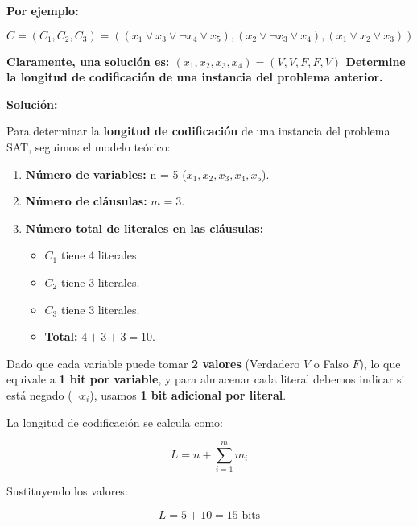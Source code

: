 \documentclass[12pt]{article}
\begin{document}
{{\begin{enumerate}
            \textbf{Por ejemplo: }

                \[
                    C = (C_1, C_2, C_3) = ((x_1 \lor x_3 \lor \neg x_4 \lor x_5), (x_2 \lor \neg x_3 \lor x_4), (x_1 \lor x_2 \lor x_3))
                \]

            \textbf{Claramente, una solución es: $(x_1, x_2, x_3, x_4) = (V, V, F, F, V)$ Determine la longitud de codificación de una instancia del problema anterior.}

            \textbf{Solución: }
            {

                Para determinar la \textbf{longitud de codificación} de una instancia del problema SAT, seguimos el modelo teórico:

                \begin{enumerate}
                    \item \textbf{Número de variables:} n = 5 ($x_1, x_2, x_3, x_4, x_5$).
                    \item \textbf{Número de cláusulas:} $m = 3$.
                    \item \textbf{Número total de literales en las cláusulas:}
                    \begin{itemize}
                        \item $C_1$ tiene 4 literales.
                        \item $C_2$ tiene 3 literales.
                        \item $C_3$ tiene 3 literales.
                        \item \textbf{Total:} $4 + 3 + 3 = 10$.
                    \end{itemize}
                \end{enumerate}
                
                Dado que cada variable puede tomar \textbf{2 valores} (Verdadero $V$ o Falso $F$), lo que equivale a \textbf{1 bit por variable}, y para almacenar cada literal debemos indicar si está negado ($\neg x_i$), usamos \textbf{1 bit adicional por literal}.
                
                La longitud de codificación se calcula como:
                
                \[
                L = n + \sum_{i=1}^{m} m_i
                \]
                
                Sustituyendo los valores:
                
                \[
                L = 5 + 10 = 15 \text{ bits}
                \]
                
}
\end{enumerate}}}
\end{document}
